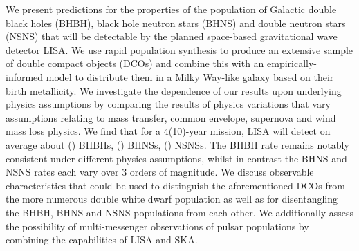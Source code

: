 We present predictions for the properties of the population of Galactic double black holes (BHBH), black hole neutron stars (BHNS) and double neutron stars (NSNS) that will be detectable by the planned space-based gravitational wave detector LISA. We use rapid population synthesis to produce an extensive sample of double compact objects (DCOs) and combine this with an empirically-informed model to distribute them in a Milky Way-like galaxy based on their birth metallicity. We investigate the dependence of our results upon underlying physics assumptions by comparing the results of \nModels{} physics variations that vary assumptions relating to mass transfer, common envelope, supernova and wind mass loss physics. We find that for a 4(10)-year mission, LISA will detect on average about \BHBHFourYear{}(\BHBHTenYear{}) BHBHs, \BHNSFourYear{}(\BHNSTenYear{}) BHNSs, \NSNSFourYear{}(\NSNSTenYear{}) NSNSs. The BHBH rate remains notably consistent under different physics assumptions, whilst in contrast the BHNS and NSNS rates each vary over 3 orders of magnitude. We discuss observable characteristics that could be used to distinguish the aforementioned DCOs from the more numerous double white dwarf population as well as for disentangling the BHBH, BHNS and NSNS populations from each other. We additionally assess the possibility of multi-messenger observations of pulsar populations by combining the capabilities of LISA and SKA.